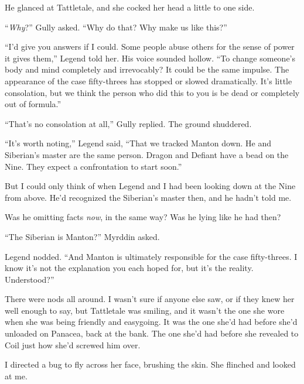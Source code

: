 He glanced at Tattletale, and she cocked her head a little to one side.



``\emph{Why}?'' Gully asked.  ``Why do that?  Why make us like this?''



``I'd give you answers if I could.  Some people abuse others for the sense of power it gives them,'' Legend told her.  His voice sounded hollow.  ``To change someone's body and mind completely and irrevocably?  It could be the same impulse.  The appearance of the case fifty-threes has stopped or slowed dramatically.  It's little consolation, but we think the person who did this to you is be dead or completely out of formula.''



``That's no consolation at all,'' Gully replied.  The ground shuddered.



``It's worth noting,'' Legend said, ``That we tracked Manton down.  He and Siberian's master are the same person.  Dragon and Defiant have a bead on the Nine.  They expect a confrontation to start soon.''



But I could only think of when Legend and I had been looking down at the Nine from above.  He'd recognized the Siberian's master then, and he hadn't told me.



Was he omitting facts \emph{now}, in the same way?  Was he lying like he had then?



``The Siberian is Manton?'' Myrddin asked.



Legend nodded.  ``And Manton is ultimately responsible for the case fifty-threes.  I know it's not the explanation you each hoped for, but it's the reality.  Understood?''



There were nods all around.  I wasn't sure if anyone else saw, or if they knew her well enough to say, but Tattletale was smiling, and it wasn't the one she wore when she was being friendly and easygoing.  It was the one she'd had before she'd unloaded on Panacea, back at the bank.  The one she'd had before she revealed to Coil just how she'd screwed him over.



I directed a bug to fly across her face, brushing the skin.  She flinched and looked at me.



